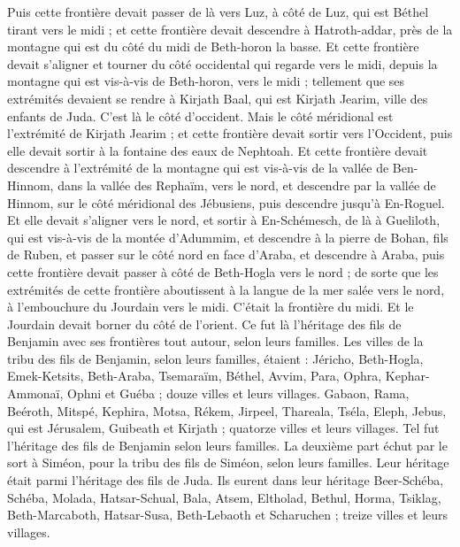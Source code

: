 \begin{multicols}{2}
Puis cette frontière devait passer de là vers Luz, à côté de Luz, qui est Béthel tirant vers le midi ; et cette frontière devait descendre à Hatroth-addar, près de la montagne qui est du côté du midi de Beth-horon la basse. 
Et cette frontière devait s'aligner et tourner du côté occidental qui regarde vers le midi, depuis la montagne qui est vis-à-vis de Beth-horon, vers le midi ; tellement que ses extrémités devaient se rendre à Kirjath Baal, qui est Kirjath Jearim, ville des enfants de Juda. C'est là le côté d'occident. 
Mais le côté méridional est l'extrémité de Kirjath Jearim ; et cette frontière devait sortir vers l'Occident, puis elle devait sortir à la fontaine des eaux de Nephtoah. 
Et cette frontière devait descendre à l'extrémité de la montagne qui est vis-à-vis de la vallée de Ben-Hinnom, dans la vallée des Rephaïm, vers le nord, et descendre par la vallée de Hinnom, sur le côté méridional des Jébusiens, puis descendre jusqu'à En-Roguel.
Et elle devait s'aligner vers le nord, et sortir à En-Schémesch, de là à Gueliloth, qui est vis-à-vis de la montée d'Adummim, et descendre à la pierre de Bohan, fils de Ruben,
et passer sur le côté nord en face d'Araba, et descendre à Araba,
puis cette frontière devait passer à côté de Beth-Hogla vers le nord ; de sorte que les extrémités de cette frontière aboutissent à la langue de la mer salée vers le nord, à l'embouchure du Jourdain vers le midi. C'était la frontière du midi.
Et le Jourdain devait borner du côté de l'orient. Ce fut là l'héritage des fils de Benjamin avec ses frontières tout autour, selon leurs familles.
Les villes de la tribu des fils de Benjamin, selon leurs familles, étaient : Jéricho, Beth-Hogla, Emek-Ketsits,
Beth-Araba, Tsemaraïm, Béthel,
Avvim, Para, Ophra,
Kephar-Ammonaï, Ophni et Guéba ; douze villes et leurs villages.
Gabaon, Rama, Beéroth,
Mitspé, Kephira, Motsa,
Rékem, Jirpeel, Thareala,
Tséla, Eleph, Jebus, qui est Jérusalem, Guibeath et Kirjath ; quatorze villes et leurs villages. Tel fut l'héritage des fils de Benjamin selon leurs familles.
\VerseOne{}La deuxième part échut par le sort à Siméon, pour la tribu des fils de Siméon, selon leurs familles. Leur héritage était parmi l'héritage des fils de Juda.
Ils eurent dans leur héritage Beer-Schéba, Schéba, Molada,
Hatsar-Schual, Bala, Atsem,
Eltholad, Bethul, Horma,
Tsiklag, Beth-Marcaboth, Hatsar-Susa,
Beth-Lebaoth et Scharuchen ; treize villes et leurs villages.

\end{multicols}
